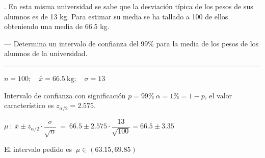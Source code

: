 \vspace{4mm} %
\vspace{2mm} \begin{example}
 .	En esta misma universidad se sabe que la desviación típica de los pesos de sus alumnos es de 13 kg. Para estimar su media se ha tallado a 100 de  ellos obteniendo una media de 66.5 kg.
 
\vspace{2mm} --- Determina un intervalo de confianza del 99\% para la media de los pesos de los alumnos de la universidad.

\rule{150pt}{0.1pt}

\vspace{2mm} $n=100;\quad \bar x=66.5 \ \mathrm{kg};\quad \sigma=13$

\vspace{2mm} Intervalo de confianza con significación $p=99\% \ \alpha=1\%=1-p$, el valor característico es $z_{\alpha/2}=2.575$. 

\vspace{2mm} $\mu \ : \ 
\bar x \pm z_{\alpha/2} \cdot \dfrac{\sigma}{\sqrt{n}} \ =\ 
66.5\pm 2.575\cdot \dfrac{13}{\sqrt{100}}=66.5\pm 3.35$

\vspace{2mm} El intervalo pedido es $\ \mu \in (63.15, 69.85)$
\end{example}

